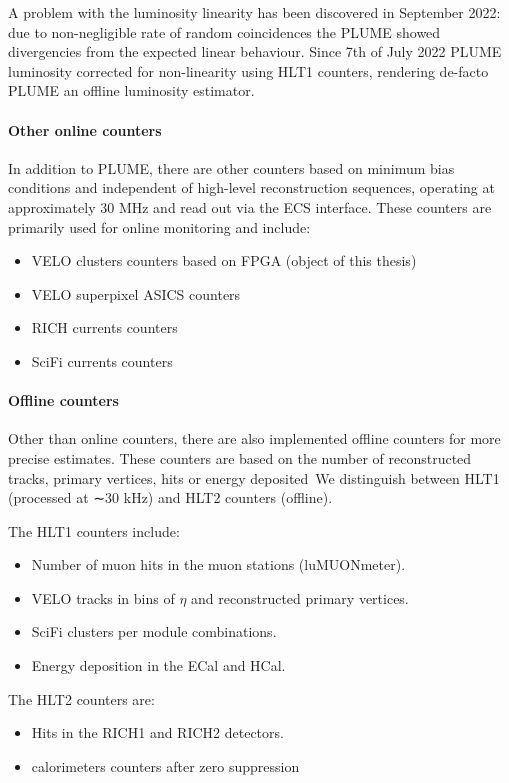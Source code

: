 A problem with the luminosity linearity has been discovered in September 2022: due to non-negligible rate of random coincidences the PLUME showed divergencies from the expected linear behaviour. Since 7th of July 2022 PLUME luminosity corrected for non-linearity using HLT1 counters, rendering de-facto PLUME an offline luminosity estimator.


\paragraph{Other online counters} 
In addition to PLUME, there are other counters based on minimum bias conditions and independent of high-level reconstruction sequences, operating at approximately 30 MHz and read out via the ECS interface. These counters are primarily used for online monitoring and include:
\begin{itemize}
   \item VELO clusters counters based on FPGA (object of this thesis)
   \item VELO superpixel ASICS counters
   \item RICH currents counters
   \item SciFi currents counters
\end{itemize}
\paragraph{Offline counters} 
Other than online counters, there are also implemented offline counters for more precise estimates.
These counters are based on the number of reconstructed tracks, primary vertices, hits or energy deposited\
We distinguish between HLT1 (processed at ∼30 kHz) and HLT2 counters (offline).

The HLT1 counters include:
\begin{itemize}
   \item Number of muon hits in the muon stations (luMUONmeter).
   \item  VELO tracks in bins of $\eta$ and reconstructed primary vertices.
   \item SciFi clusters per module combinations.
   \item Energy deposition in the ECal and HCal.
\end{itemize}
The HLT2 counters are:
\begin{itemize}
    \item Hits in the RICH1 and RICH2 detectors.
    \item calorimeters counters after zero suppression 
\end{itemize}


